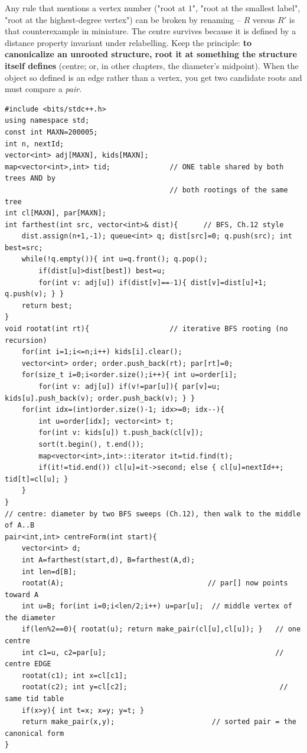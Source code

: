 \begin{insightbox}
Any rule that mentions a vertex number ("root at \(1\)", "root at the smallest
label", "root at the highest-degree vertex") can be broken by renaming -- \(R\)
versus \(R'\) is that counterexample in miniature.  The centre survives because
it is defined by a distance property invariant under relabelling.  Keep the
principle: \textbf{to canonicalize an unrooted structure, root it at something
the structure itself defines} (centre; or, in other chapters, the diameter's
midpoint).  When the object so defined is an edge rather than a vertex, you get
two candidate roots and must compare a \emph{pair}.
\end{insightbox}

\begin{lstlisting}[caption={Unrooted isomorphism: centre via the diameter (Ch.12 black box), then one shared interned labeller; two centres mean two rooted forms, compared as a sorted pair. ASCII only, identifiers without underscores}, label={lst:c22-unrooted}]
#include <bits/stdc++.h>
using namespace std;
const int MAXN=200005;
int n, nextId;
vector<int> adj[MAXN], kids[MAXN];
map<vector<int>,int> tid;              // ONE table shared by both trees AND by
                                       // both rootings of the same tree
int cl[MAXN], par[MAXN];
int farthest(int src, vector<int>& dist){      // BFS, Ch.12 style
    dist.assign(n+1,-1); queue<int> q; dist[src]=0; q.push(src); int best=src;
    while(!q.empty()){ int u=q.front(); q.pop();
        if(dist[u]>dist[best]) best=u;
        for(int v: adj[u]) if(dist[v]==-1){ dist[v]=dist[u]+1; q.push(v); } }
    return best;
}
void rootat(int rt){                   // iterative BFS rooting (no recursion)
    for(int i=1;i<=n;i++) kids[i].clear();
    vector<int> order; order.push_back(rt); par[rt]=0;
    for(size_t i=0;i<order.size();i++){ int u=order[i];
        for(int v: adj[u]) if(v!=par[u]){ par[v]=u; kids[u].push_back(v); order.push_back(v); } }
    for(int idx=(int)order.size()-1; idx>=0; idx--){
        int u=order[idx]; vector<int> t;
        for(int v: kids[u]) t.push_back(cl[v]);
        sort(t.begin(), t.end());
        map<vector<int>,int>::iterator it=tid.find(t);
        if(it!=tid.end()) cl[u]=it->second; else { cl[u]=nextId++; tid[t]=cl[u]; }
    }
}
// centre: diameter by two BFS sweeps (Ch.12), then walk to the middle of A..B
pair<int,int> centreForm(int start){
    vector<int> d;
    int A=farthest(start,d), B=farthest(A,d);
    int len=d[B];
    rootat(A);                                  // par[] now points toward A
    int u=B; for(int i=0;i<len/2;i++) u=par[u];  // middle vertex of the diameter
    if(len%2==0){ rootat(u); return make_pair(cl[u],cl[u]); }   // one centre
    int c1=u, c2=par[u];                                        // centre EDGE
    rootat(c1); int x=cl[c1];
    rootat(c2); int y=cl[c2];                                    // same tid table
    if(x>y){ int t=x; x=y; y=t; }
    return make_pair(x,y);                       // sorted pair = the canonical form
}
\end{lstlisting}

